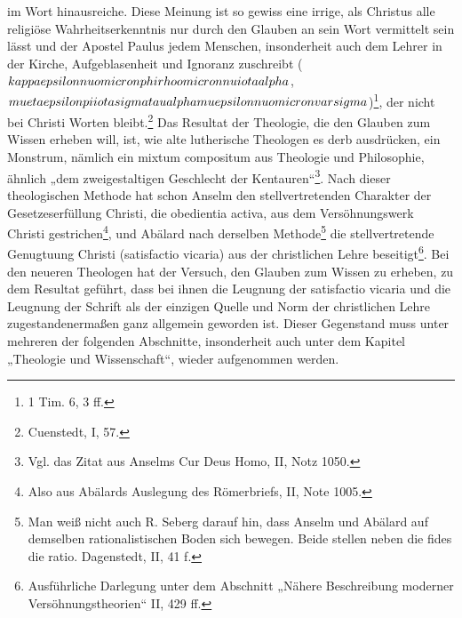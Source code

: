 im Wort hinausreiche. Diese Meinung ist so gewiss eine irrige, als Christus alle religiöse Wahrheitserkenntnis nur durch den Glauben an sein Wort vermittelt sein lässt und der Apostel Paulus jedem Menschen, insonderheit auch dem Lehrer in der Kirche, Aufgeblasenheit und Ignoranz zuschreibt ($\\kappa\\epsilon\\nu\\omicron\\phi\\rho\\omicron\\nu\\iota\\alpha$, $\\mu\\eta\\ \\epsilon\\pi\\iota\\sigma\\tau\\alpha\\mu\\epsilon\\nu\\omicron\\varsigma$)\footnote{1 Tim. 6, 3 ff.}, der nicht bei Christi Worten bleibt.\footnote{Cuenstedt, I, 57.} Das Resultat der Theologie, die den Glauben zum Wissen erheben will, ist, wie alte lutherische Theologen es derb ausdrücken, ein Monstrum, nämlich ein mixtum compositum aus Theologie und Philosophie, ähnlich „dem zweigestaltigen Geschlecht der Kentauren“\footnote{Vgl. das Zitat aus Anselms Cur Deus Homo, II, Notz 1050.}. Nach dieser theologischen Methode hat schon Anselm den stellvertretenden Charakter der Gesetzeserfüllung Christi, die obedientia activa, aus dem Versöhnungswerk Christi gestrichen\footnote{Also aus Abälards Auslegung des Römerbriefs, II, Note 1005.}, und Abälard nach derselben Methode\footnote{Man weiß nicht auch R. Seberg darauf hin, dass Anselm und Abälard auf demselben rationalistischen Boden sich bewegen. Beide stellen neben die fides die ratio. Dagenstedt, II, 41 f.} die stellvertretende Genugtuung Christi (satisfactio vicaria) aus der christlichen Lehre beseitigt\footnote{Ausführliche Darlegung unter dem Abschnitt „Nähere Beschreibung moderner Versöhnungstheorien“ II, 429 ff.}. Bei den neueren Theologen hat der Versuch, den Glauben zum Wissen zu erheben, zu dem Resultat geführt, dass bei ihnen die Leugnung der satisfactio vicaria und die Leugnung der Schrift als der einzigen Quelle und Norm der christlichen Lehre zugestandenermaßen ganz allgemein geworden ist. Dieser Gegenstand muss unter mehreren der folgenden Abschnitte, insonderheit auch unter dem Kapitel „Theologie und Wissenschaft“, wieder aufgenommen werden.


